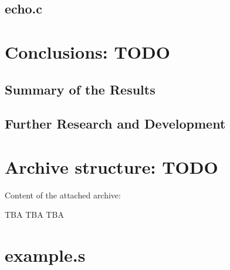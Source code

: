 \documentclass[12pt, twoside]{fithesis2}
\renewcommand{\_}{\leavevmode \kern0.07em\vbox{\hrule width0.4em}}
\begin{document}
\section{echo.c}
\label{sec:echo}





\chapter{Conclusions: TODO}
\label{chap:conclusions}

\section{Summary of the Results}
\label{sec:conclusions-summary}


\section{Further Research and Development}
\label{sec:conclusions-next}



\appendix

\printbibliography

\chapter{Archive structure: TODO}
\label{appendix:archive}

Content of the attached archive:

TBA TBA TBA


\chapter{example.s}
\label{appendix:example}
\end{document}
